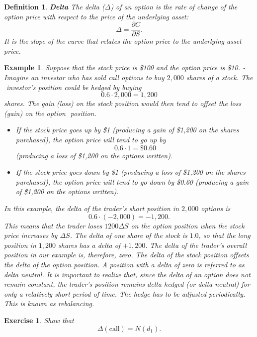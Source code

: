 \documentclass[letterpaper,10pt]{article}
\newtheorem{df}{Definition}[section]
\newtheorem{ex}{Exercise}
\newtheorem{exa}{Example}[section]
\begin{document}
\begin{df}{\bf Delta}
The delta ($\Delta$) of an option is the rate of
change of the option price with respect to the price of the underlying asset: $$\Delta=\frac{\partial C}{\partial S}.$$ It is the
slope of the curve that relates the option price to the underlying asset price.
\end{df}

\begin{exa}\label{delta-hedging}
Suppose that the stock price is \$100 and the option price is \$10.
­ Imagine an investor who has sold call options to buy $2,000$ shares of a stock. The
­ investor’s position could be hedged by buying $$0.6 \cdot 2,000= 1,200$$ shares. The gain
(loss) on the stock position would then tend to offset the loss (gain) on the option
­ position. 

\begin{itemize}

\item If the stock price goes up by \$1 (producing a gain of \$1,200 on
the shares purchased), the option price will tend to go up by $$0.6 \cdot 1= \$0.60$$
(producing a loss of \$1,200 on the options written).

\item If the stock price goes down by
\$1 (producing a loss of \$1,200 on the shares purchased), the option price will tend to go
down by \$0.60 (producing a gain of \$1,200 on the options written).

\end{itemize} 
In this example, the delta of the trader’s short position in $2,000$ options is
$$0.6 \cdot (-2,000)=-1,200.$$
This means that the trader loses $1200\Delta S$ on the option position when the stock price increases by $\Delta S$. The delta of one share of the stock is $1.0$, so that the long position in
$1,200$ shares has a delta of $+1,200$. The delta of the trader’s overall position in our
example is, therefore, zero. The delta of the stock position offsets the delta of the option
position. A position with a delta of zero is referred to as delta neutral.
It is important to realize that, since the delta of an option does not remain constant,
the trader’s position remains delta hedged (or delta neutral) for only a relatively short
period of time. The hedge has to be adjusted periodically. This is known as rebalancing.
\end{exa}

\begin{ex}
Show that $$\Delta(\text{call})=N(d_1).$$
\end{ex}
\end{document}

